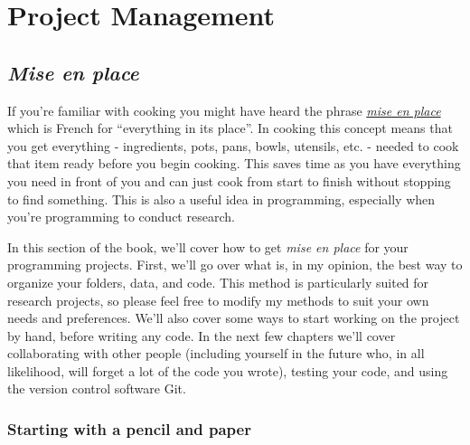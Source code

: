 \documentclass[
  12pt,
  openany]{book}
\begin{document}
\hypertarget{part-project-management}{%
\part{Project Management}\label{part-project-management}}

\hypertarget{mise-en-place}{%
\chapter{\texorpdfstring{\emph{Mise en place}}{Mise en place}}\label{mise-en-place}}

If you're familiar with cooking you might have heard the phrase \href{https://en.wikipedia.org/wiki/Mise_en_place}{\emph{mise en place}} which is French for ``everything in its place''. In cooking this concept means that you get everything - ingredients, pots, pans, bowls, utensils, etc. - needed to cook that item ready before you begin cooking. This saves time as you have everything you need in front of you and can just cook from start to finish without stopping to find something. This is also a useful idea in programming, especially when you're programming to conduct research.

In this section of the book, we'll cover how to get \emph{mise en place} for your programming projects. First, we'll go over what is, in my opinion, the best way to organize your folders, data, and code. This method is particularly suited for research projects, so please feel free to modify my methods to suit your own needs and preferences. We'll also cover some ways to start working on the project by hand, before writing any code. In the next few chapters we'll cover collaborating with other people (including yourself in the future who, in all likelihood, will forget a lot of the code you wrote), testing your code, and using the version control software Git.

\hypertarget{starting-with-a-pencil-and-paper}{%
\section{Starting with a pencil and paper}\label{starting-with-a-pencil-and-paper}}
\end{document}
